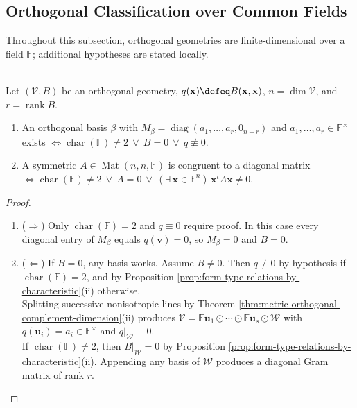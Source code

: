 \subsection{Orthogonal Classification over Common Fields}

Throughout this subsection, orthogonal geometries are finite-dimensional over a field $\mathbb{F}$; additional hypotheses are stated locally.

\begin{theorem} \label{thm:orthogonal-bases-and-diagonal-congruence} \\
Let $(\mathcal{V},B)$ be an orthogonal geometry, $q(\mathbf{x})\defeq B(\mathbf{x},\mathbf{x})$, $n=\dim\mathcal{V}$, and $r=\operatorname{rank}B$.
\begin{enumerate}[label=(\roman*)]
\setlength{\itemsep}{0pt}
\item An orthogonal basis $\beta$ with $M_{\beta}=\operatorname{diag}(a_1,\ldots,a_r,0_{n-r})$ and $a_1,\ldots,a_r\in\mathbb{F}^{\times}$ exists $\Longleftrightarrow\operatorname{char}(\mathbb{F})\neq2\ \vee\ B=0\ \vee\ q\not\equiv0$.
\item A symmetric $A\in\operatorname{Mat}(n,n,\mathbb{F})$ is congruent to a diagonal matrix $\Longleftrightarrow\operatorname{char}(\mathbb{F})\neq2\ \vee\ A=0\ \vee\ (\exists\,\mathbf{x}\in\mathbb{F}^n)\,\mathbf{x}^tA\mathbf{x}\neq0$.
\end{enumerate}
\begin{proof}
\begin{enumerate}[label=(\roman*)]
\setlength{\itemsep}{0pt}
\item[$(i)$] ($\Rightarrow$) Only $\operatorname{char}(\mathbb{F})=2$ and $q\equiv0$ require proof. In this case every diagonal entry of $M_{\beta}$ equals $q(\mathbf{v})=0$, so $M_{\beta}=0$ and $B=0$.
\item[$(i)$] ($\Leftarrow$) If $B=0$, any basis works. Assume $B\neq0$. Then $q\not\equiv0$ by hypothesis if $\operatorname{char}(\mathbb{F})=2$, and by Proposition \ref{prop:form-type-relations-by-characteristic}(ii) otherwise.\\
Splitting successive nonisotropic lines by Theorem \ref{thm:metric-orthogonal-complement-dimension}(ii) produces $\mathcal{V}=\mathbb{F}\mathbf{u}_1\odot\cdots\odot\mathbb{F}\mathbf{u}_s\odot\mathcal{W}$ with $q(\mathbf{u}_i)=a_i\in\mathbb{F}^{\times}$ and $q|_{\mathcal{W}}\equiv0$.\\
If $\operatorname{char}(\mathbb{F})\neq2$, then $B|_{\mathcal{W}}=0$ by Proposition \ref{prop:form-type-relations-by-characteristic}(ii). Appending any basis of $\mathcal{W}$ produces a diagonal Gram matrix of rank $r$.\\

\end{enumerate}
\end{proof}
\end{theorem}
